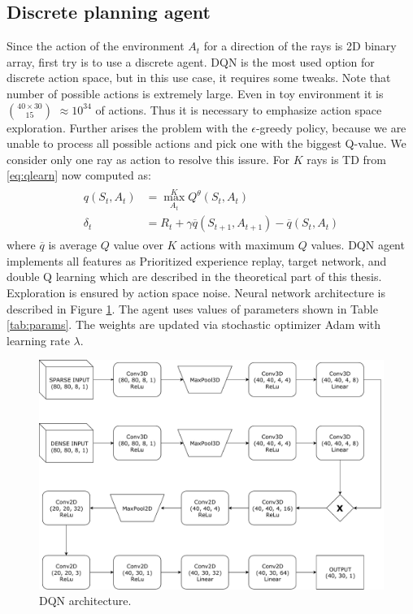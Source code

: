 \subsection{Discrete planning agent}
Since the action of the environment $A_t$ for a direction of the rays is 2D binary array, first try is to use a discrete agent. DQN is the most used option for discrete action space, but in this use case, it requires some tweaks. Note that number of possible actions is extremely large. Even in toy environment it is $40\times30 \choose 15$ $\approx 10^{34}$ of actions. Thus it is necessary to emphasize action space exploration. Further arises the problem with the $\epsilon$-greedy policy, because we are unable to process all possible actions and pick one with the biggest Q-value. We consider only one ray as action to resolve this issure. For $K$ rays is TD from \eqref{eq:qlearn} now computed as:
\begin{align} \label{eq:dql}
\begin{split}
q(S_t, A_t) &= \max\limits_{A_t}^K Q^\theta(S_t, A_t)\\
\delta_t &= R_t + \gamma \overline{q}(S_{t+1}, A_{t+1}) - \overline{q}(S_t, A_t)
\end{split}
\end{align}
where $\overline{q}$ is average $Q$ value over $K$ actions with maximum $Q$ values. DQN agent implements all features as Prioritized experience replay, target network, and double Q learning which are described in the theoretical part of this thesis. Exploration is ensured by action space noise. Neural network architecture is described in Figure \ref{fig:dqn}. The agent uses values of parameters shown in Table \ref{tab:params}. The weights are updated via stochastic optimizer Adam with learning rate $\lambda$.

\clearpage
\begin{figure}[!h]
\centering
\includegraphics[scale=0.6]{fig/dql.pdf}
\caption{DQN architecture.}
\label{fig:dqn}
\end{figure}

